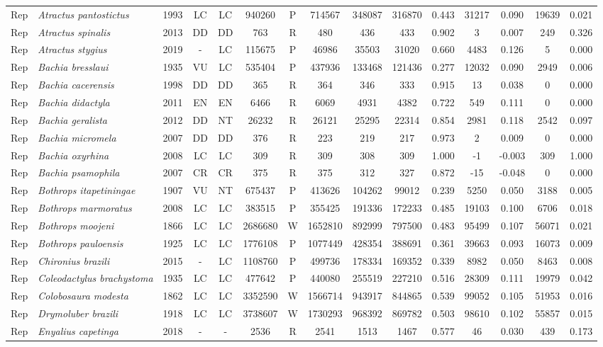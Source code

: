\documentclass[12pt,openright,oneside,a4paper,english]{abntex2}
\begin{document}
\begin{landscape}
\begin{longtable}{llccccccccccccc}
		Rep&\textit{Atractus pantostictus}&1993&LC&LC&940260&P&714567&348087&316870&0.443&31217&0.090&19639&0.021\\
		Rep&\textit{Atractus spinalis}&2013&DD&DD&763&R&480&436&433&0.902&3&0.007&249&0.326\\
		Rep&\textit{Atractus stygius}&2019&-&LC&115675&P&46986&35503&31020&0.660&4483&0.126&5&0.000\\
		Rep&\textit{Bachia bresslaui}&1935&VU&LC&535404&P&437936&133468&121436&0.277&12032&0.090&2949&0.006\\
		Rep&\textit{Bachia cacerensis}&1998&DD&DD&365&R&364&346&333&0.915&13&0.038&0&0.000\\
		Rep&\textit{Bachia didactyla}&2011&EN&EN&6466&R&6069&4931&4382&0.722&549&0.111&0&0.000\\
		Rep&\textit{Bachia geralista}&2012&DD&NT&26232&R&26121&25295&22314&0.854&2981&0.118&2542&0.097\\
		Rep&\textit{Bachia micromela}&2007&DD&DD&376&R&223&219&217&0.973&2&0.009&0&0.000\\
		Rep&\textit{Bachia oxyrhina}&2008&LC&LC&309&R&309&308&309&1.000&-1&-0.003&309&1.000\\
		Rep&\textit{Bachia psamophila}&2007&CR&CR&375&R&375&312&327&0.872&-15&-0.048&0&0.000\\
		Rep&\textit{Bothrops itapetiningae}&1907&VU&NT&675437&P&413626&104262&99012&0.239&5250&0.050&3188&0.005\\
		Rep&\textit{Bothrops marmoratus}&2008&LC&LC&383515&P&355425&191336&172233&0.485&19103&0.100&6706&0.018\\
		Rep&\textit{Bothrops moojeni}&1866&LC&LC&2686680&W&1652810&892999&797500&0.483&95499&0.107&56071&0.021\\
		Rep&\textit{Bothrops pauloensis}&1925&LC&LC&1776108&P&1077449&428354&388691&0.361&39663&0.093&16073&0.009\\
		Rep&\textit{Chironius brazili}&2015&-&LC&1108760&P&499736&178334&169352&0.339&8982&0.050&8463&0.008\\
		Rep&\textit{Coleodactylus brachystoma}&1935&LC&LC&477642&P&440080&255519&227210&0.516&28309&0.111&19979&0.042\\
		Rep&\textit{Colobosaura modesta}&1862&LC&LC&3352590&W&1566714&943917&844865&0.539&99052&0.105&51953&0.016\\
		Rep&\textit{Drymoluber brazili}&1918&LC&LC&3738607&W&1730293&968392&869782&0.503&98610&0.102&55857&0.015\\
		Rep&\textit{Enyalius capetinga}&2018&-&-&2536&R&2541&1513&1467&0.577&46&0.030&439&0.173\\

\end{longtable}
\end{landscape}
\end{document}
